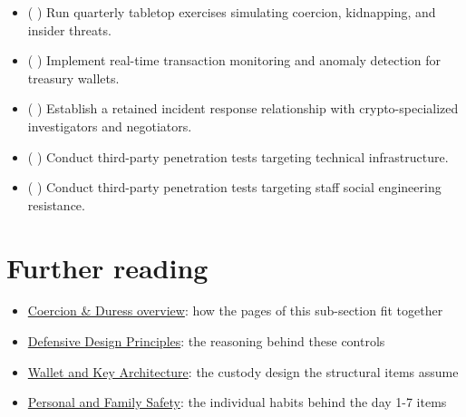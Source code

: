 \begin{itemize}
\tightlist
\item
  ( ) Run quarterly tabletop exercises simulating coercion, kidnapping, and insider threats.
\item
  ( ) Implement real-time transaction monitoring and anomaly detection for treasury wallets.
\item
  ( ) Establish a retained incident response relationship with crypto-specialized investigators and negotiators.
\item
  ( ) Conduct third-party penetration tests targeting technical infrastructure.
\item
  ( ) Conduct third-party penetration tests targeting staff social engineering resistance.
\end{itemize}

\section{Further reading}\label{further-reading-11}

\begin{itemize}
\tightlist
\item
  \href{https://frameworks.securityalliance.dev/physical-security/coercion-and-duress/overview}{Coercion \& Duress overview}: how the pages of this sub-section fit together
\item
  \href{https://frameworks.securityalliance.dev/physical-security/coercion-and-duress/defensive-design-principles}{Defensive Design Principles}: the reasoning behind these controls
\item
  \href{https://frameworks.securityalliance.dev/physical-security/coercion-and-duress/wallet-and-key-architecture}{Wallet and Key Architecture}: the custody design the structural items assume
\item
  \href{https://frameworks.securityalliance.dev/physical-security/coercion-and-duress/personal-and-family-safety}{Personal and Family Safety}: the individual habits behind the day 1-7 items
\end{itemize}
